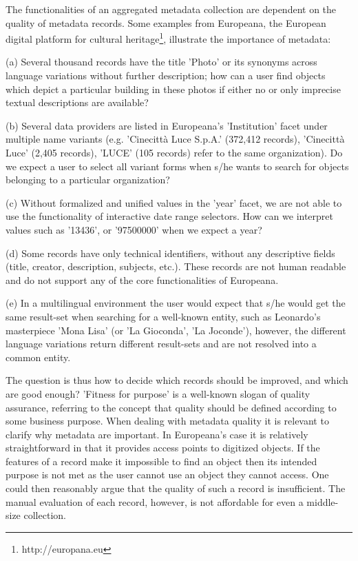 The functionalities of an aggregated metadata collection are dependent on the quality of metadata records. Some examples from Europeana, the European digital platform for cultural heritage\footnote{http://europana.eu}, illustrate the importance of metadata:

(a) Several thousand records have the title 'Photo' or its synonyms across language variations without further description; how can a user find  objects which depict a particular building in these photos if either no or only imprecise textual descriptions are available?

(b) Several data providers are listed in Europeana's 'Institution' facet under multiple name variants (e.g. 'Cinecittà Luce S.p.A.' (372,412 records), 'Cinecittà Luce' (2,405 records), 'LUCE' (105 records)  refer to the same organization). Do we expect a user to select all variant forms when s/he wants to search for objects belonging to a particular organization?

(c) Without formalized and unified values in the 'year' facet, we are not able to use the functionality of interactive date range selectors. How can we interpret values such as '13436', or '97500000' when we expect a year?

(d) Some records have only technical identifiers, without any descriptive fields (title, creator, description, subjects, etc.). These records are not human readable and do not support any of the core functionalities of Europeana.

(e) In a multilingual environment the user would expect that s/he would get the same result-set when searching for a well-known entity, such as Leonardo's masterpiece 'Mona Lisa' (or 'La Gioconda', 'La Joconde'), however, the different language variations return different result-sets and are not resolved into a common entity.

The question is thus how to decide which records should be improved, and which are good enough? 'Fitness for purpose' is a well-known slogan of quality assurance, referring to the concept that quality should be defined according to some business purpose. When dealing with metadata quality it is relevant to clarify why metadata are important. In Europeana's case it is relatively straightforward in that it provides access points to digitized objects. If the features of a record make it impossible to find an object then its intended purpose is not met as the user cannot use an object they cannot access. One could then reasonably argue that the quality of such a record is insufficient. The manual evaluation of each record, however, is not affordable for even a middle-size collection.


